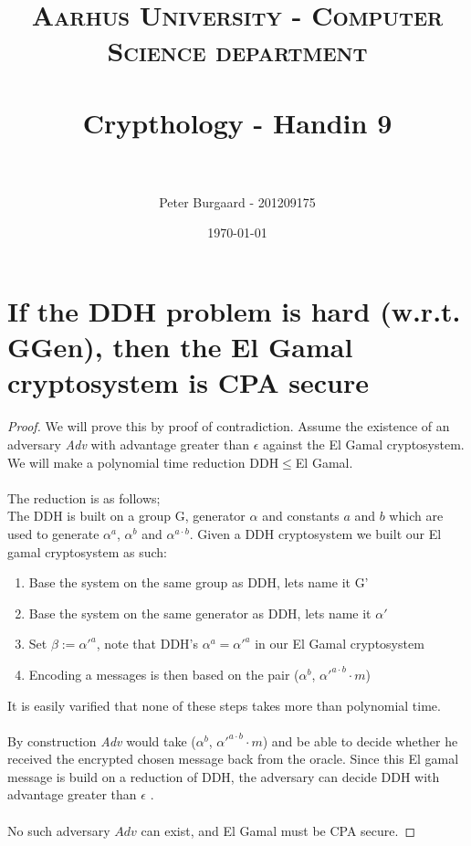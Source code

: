 \documentclass[paper=a4, fontsize=11pt]{scrartcl} %
\title{	
	\normalfont \normalsize 
	\textsc{Aarhus University - Computer Science department} \\ [25pt] %
	\horrule{0.5pt} \\[0.4cm] %
	\huge Crypthology - Handin 9 \\ %
	\horrule{2pt} \\[0.5cm] %
}
\author{Peter Burgaard - 201209175} %
\date{\normalsize\today} %
\numberwithin{equation}{section} %
\numberwithin{figure}{section} %
\numberwithin{table}{section} %
\begin{document}
	
	\maketitle %

\section*{If the DDH problem is hard (w.r.t. GGen), then the El Gamal cryptosystem is CPA secure}
\begin{proof}
We will prove this by proof of contradiction. Assume the existence of an adversary \textit{Adv} with advantage greater than $\epsilon$ against the El Gamal cryptosystem. We will make a polynomial time reduction DDH$\leq$El Gamal. 
\\ \\ 
The reduction is as follows; \\
The DDH is built on a group G, generator $\alpha$ and constants $a$ and $b$ which are used to generate $\alpha^a$, $\alpha^b$ and $\alpha^{a\cdot b}$. Given a DDH cryptosystem we built our El gamal cryptosystem as such:
\begin{enumerate}
\item Base the system on the same group as DDH, lets name it G'
\item Base the system on the same generator as DDH, lets name it $\alpha'$
\item Set $\beta:=\alpha'^a$, note that DDH's $\alpha^a=\alpha'^a$ in our El Gamal cryptosystem
\item Encoding a messages is then based on the pair ($\alpha^b$, $\alpha'^{a\cdot b}\cdot m$)
\end{enumerate}
It is easily varified that none of these steps takes more than polynomial time. 
\\ \\
By construction \textit{Adv} would take ($\alpha^b$, $\alpha'^{a\cdot b}\cdot m$) and be able to decide whether he received the encrypted chosen message back from the oracle. Since this El gamal message is build on a reduction of DDH, the adversary can decide DDH with advantage greater than $\epsilon$ \Lightning.
\\ \\
No such adversary $Adv$ can exist, and El Gamal must be CPA secure.
\end{proof}
\end{document}
